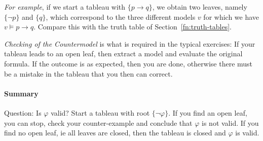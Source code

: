 \documentclass[11pt]{article}
\renewcommand{\phi}{\varphi}
\newcommand{\imp}{\ensuremath{\rightarrow}}
\begin{document}
\medskip\noindent \emph{For example}, if we start a tableau with
$\{p\imp q\}$, we obtain two leaves, namely $\{\neg p\}$ and $\{q\}$,
which correspond to the three different models $v$ for which we have
$v\models p\imp q$. Compare this with the truth table of
Section~\ref{fn:truth-tables}.

\medskip\noindent\emph{Checking of the Countermodel} is what is
required in the typical exercises: If your tableau leads to an open
leaf, then extract a model and evaluate the original formula. If the
outcome is as expected, then you are done, otherwise there must be a
mistake in the tableau that you then can correct.


\paragraph{Summary } Question: Is $\phi$ valid? Start a tableau with
root $\{\neg\phi\}$. If you find an open leaf, you can stop, check
your counter-example and conclude that $\phi$ is not valid. If you
find no open leaf, ie all leaves are closed, then the tableau is
closed and $\phi$ is valid.


% 








\newpage
\appendix


\end{document}
